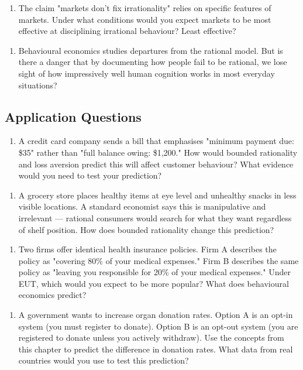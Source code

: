 \documentclass[12pt, letterpaper]{article}
\begin{document}
\begin{enumerate}
\item The claim "markets don't fix irrationality" relies on specific features of markets. Under what conditions would you expect markets to be most effective at disciplining irrational behaviour? Least effective?
\end{enumerate}

\begin{enumerate}
\item Behavioural economics studies departures from the rational model. But is there a danger that by documenting how people fail to be rational, we lose sight of how impressively well human cognition works in most everyday situations?
\end{enumerate}


\subsection{Application Questions}


\begin{enumerate}
\item A credit card company sends a bill that emphasises "minimum payment due: \$35" rather than "full balance owing: \$1,200." How would bounded rationality and loss aversion predict this will affect customer behaviour? What evidence would you need to test your prediction?
\end{enumerate}

\begin{enumerate}
\item A grocery store places healthy items at eye level and unhealthy snacks in less visible locations. A standard economist says this is manipulative and irrelevant --- rational consumers would search for what they want regardless of shelf position. How does bounded rationality change this prediction?
\end{enumerate}

\begin{enumerate}
\item Two firms offer identical health insurance policies. Firm A describes the policy as "covering 80\% of your medical expenses." Firm B describes the same policy as "leaving you responsible for 20\% of your medical expenses." Under EUT, which would you expect to be more popular? What does behavioural economics predict?
\end{enumerate}

\begin{enumerate}
\item A government wants to increase organ donation rates. Option A is an opt-in system (you must register to donate). Option B is an opt-out system (you are registered to donate unless you actively withdraw). Use the concepts from this chapter to predict the difference in donation rates. What data from real countries would you use to test this prediction?
\end{enumerate}
\end{document}
